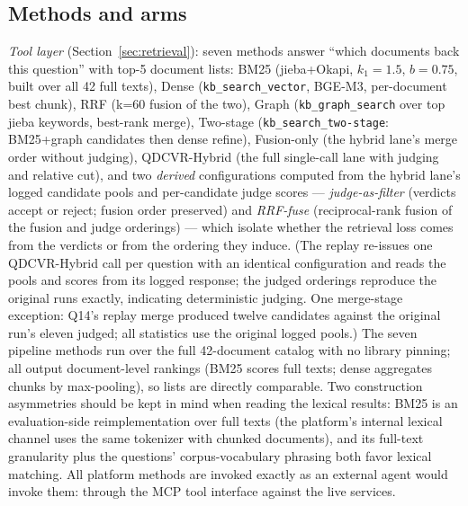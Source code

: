 \documentclass[preprint,12pt]{elsarticle}
\begin{document}
\subsection{Methods and arms}
\sloppypar
\emph{Tool layer} (Section~\ref{sec:retrieval}): seven methods answer ``which
documents back this question'' with top-5 document lists: BM25 (jieba+Okapi,
$k_1{=}1.5$, $b{=}0.75$, built over all 42 full texts), Dense
(\texttt{kb\_search\_vector}, BGE-M3, per-document best chunk), RRF (k=60
fusion of the two), Graph (\texttt{kb\_graph\_search} over top jieba
keywords, best-rank merge), Two-stage (\texttt{kb\_search\_two-stage}:
BM25+graph candidates then dense refine), Fusion-only (the hybrid lane's
merge order without judging), QDCVR-Hybrid (the full single-call lane
with judging and relative cut), and two \emph{derived} configurations
computed from the hybrid lane's logged candidate pools and per-candidate
judge scores --- \emph{judge-as-filter} (verdicts accept or reject; fusion
order preserved) and \emph{RRF-fuse} (reciprocal-rank fusion of the fusion
and judge orderings) --- which isolate whether the retrieval loss comes
from the verdicts or from the ordering they induce. (The replay re-issues
one QDCVR-Hybrid call per question with an identical configuration and
reads the pools and scores from its logged response; the judged orderings
reproduce the original runs exactly, indicating deterministic judging.
One merge-stage exception: Q14's replay merge produced twelve candidates
against the original run's eleven judged; all statistics use the original
logged pools.)
The seven pipeline methods
run over the full
42-document catalog with no library pinning; all output document-level
rankings (BM25 scores full texts; dense aggregates chunks by max-pooling),
so lists are directly comparable. Two construction asymmetries should be
kept in mind when reading the lexical results: BM25 is an evaluation-side
reimplementation over full texts (the platform's internal lexical channel
uses the same tokenizer with chunked documents), and its full-text
granularity plus the questions' corpus-vocabulary phrasing both favor
lexical matching. All platform methods are invoked exactly as
an external agent would invoke them: through the MCP tool interface against
the live services.
\end{document}
